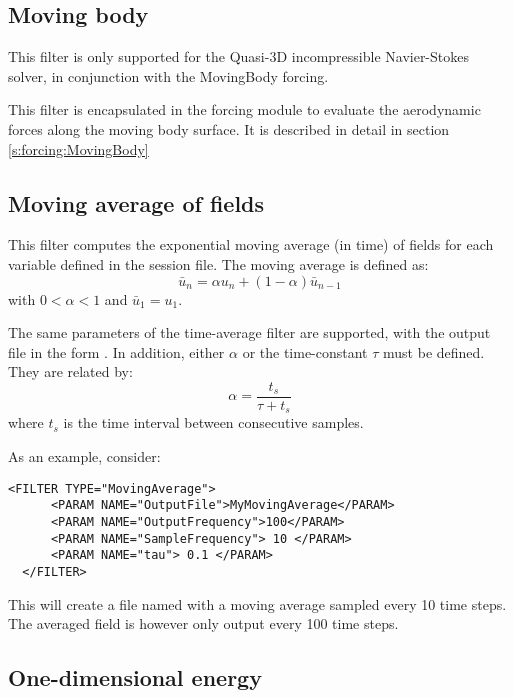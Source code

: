 \subsection{Moving body}\label{filters:MovingBody}

\begin{notebox}
  This filter is only supported for the Quasi-3D incompressible Navier-Stokes
  solver, in conjunction with the MovingBody forcing.
\end{notebox}

This filter  is encapsulated in the forcing module
to evaluate the aerodynamic forces along the moving body surface.
It is described in detail in section \ref{s:forcing:MovingBody}


\subsection{Moving average of fields}

This filter computes the exponential moving average (in time) of
fields for each variable defined in the session file. The moving average 
is defined as:
\[
\bar{u}_n = \alpha u_n + (1 - \alpha)\bar{u}_{n-1}
\]
with $0 < \alpha < 1$ and $\bar{u}_1 = u_1$.

The same parameters of the time-average filter are supported, with the output file
in the form . In addition,
either $\alpha$ or the time-constant $\tau$ must be defined. They are related by:
\[
\alpha = \frac{t_s}{\tau + t_s}
\]
where $t_s$ is the time interval between consecutive samples.

As an example, consider:

\begin{lstlisting}[style=XMLStyle,gobble=2]
  <FILTER TYPE="MovingAverage">
      <PARAM NAME="OutputFile">MyMovingAverage</PARAM>
      <PARAM NAME="OutputFrequency">100</PARAM>
      <PARAM NAME="SampleFrequency"> 10 </PARAM>
      <PARAM NAME="tau"> 0.1 </PARAM>
  </FILTER>
\end{lstlisting}

This will create a file named  with a moving average
sampled every 10 time steps. The averaged field is however only
output every 100 time steps.

\subsection{One-dimensional energy}

